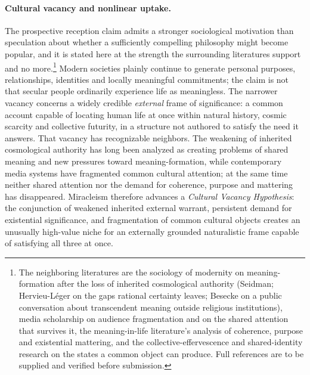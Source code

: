 \paragraph{Cultural vacancy and nonlinear uptake.} The prospective reception claim admits a stronger sociological motivation than speculation about whether a sufficiently compelling philosophy might become popular, and it is stated here at the strength the surrounding literatures support and no more.\footnote{The neighboring literatures are the sociology of modernity on meaning-formation after the loss of inherited cosmological authority (Seidman; Hervieu-L\'eger on the gaps rational certainty leaves; Besecke on a public conversation about transcendent meaning outside religious institutions), media scholarship on audience fragmentation and on the shared attention that survives it, the meaning-in-life literature's analysis of coherence, purpose and existential mattering, and the collective-effervescence and shared-identity research on the states a common object can produce. Full references are to be supplied and verified before submission.} Modern societies plainly continue to generate personal purposes, relationships, identities and locally meaningful commitments; the claim is not that secular people ordinarily experience life as meaningless. The narrower vacancy concerns a widely credible \emph{external} frame of significance: a common account capable of locating human life at once within natural history, cosmic scarcity and collective futurity, in a structure not authored to satisfy the need it answers. That vacancy has recognizable neighbors. The weakening of inherited cosmological authority has long been analyzed as creating problems of shared meaning and new pressures toward meaning-formation, while contemporary media systems have fragmented common cultural attention; at the same time neither shared attention nor the demand for coherence, purpose and mattering has disappeared. Miracleism therefore advances a \emph{Cultural Vacancy Hypothesis}: the conjunction of weakened inherited external warrant, persistent demand for existential significance, and fragmentation of common cultural objects creates an unusually high-value niche for an externally grounded naturalistic frame capable of satisfying all three at once.

